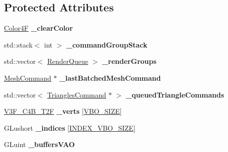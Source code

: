 \subsection*{Protected Attributes}
\begin{DoxyCompactItemize}
\item 
\mbox{\label{classRenderer_afe935eb7031cf3d5c68181e28f608972}} 
\hyperlink{structColor4F}{Color4F} {\bfseries \+\_\+clear\+Color}
\item 
\mbox{\label{classRenderer_a24f732b714ee4abcf3a256fbf78e697f}} 
std\+::stack$<$ int $>$ {\bfseries \+\_\+command\+Group\+Stack}
\item 
\mbox{\label{classRenderer_aeda6c2c7a5a5e8369c24e59eba37a03a}} 
std\+::vector$<$ \hyperlink{classRenderQueue}{Render\+Queue} $>$ {\bfseries \+\_\+render\+Groups}
\item 
\mbox{\label{classRenderer_ae9423c9b8ab799fb0f9173e09b10ea0a}} 
\hyperlink{classMeshCommand}{Mesh\+Command} $\ast$ {\bfseries \+\_\+last\+Batched\+Mesh\+Command}
\item 
\mbox{\label{classRenderer_af0e8a4e1834ce574e77b441c28df080d}} 
std\+::vector$<$ \hyperlink{classTrianglesCommand}{Triangles\+Command} $\ast$ $>$ {\bfseries \+\_\+queued\+Triangle\+Commands}
\item 
\mbox{\label{classRenderer_a4edfdd4a8eab5f3126ca0dc4ba817921}} 
\hyperlink{structV3F__C4B__T2F}{V3\+F\+\_\+\+C4\+B\+\_\+\+T2F} {\bfseries \+\_\+verts} \mbox{[}\hyperlink{classRenderer_adf68e0f4b14d92f2e8f357f44c52dd1d}{V\+B\+O\+\_\+\+S\+I\+ZE}\mbox{]}
\item 
\mbox{\label{classRenderer_aa3e0b017f3babd7cd3959f739b71e6bd}} 
G\+Lushort {\bfseries \+\_\+indices} \mbox{[}\hyperlink{classRenderer_a83bd66787b385c8a009d3cd64af54057}{I\+N\+D\+E\+X\+\_\+\+V\+B\+O\+\_\+\+S\+I\+ZE}\mbox{]}
\item 
\mbox{\label{classRenderer_aba5baf5389b40247a9c9fb88229f2832}} 
G\+Luint {\bfseries \+\_\+buffers\+V\+AO}
\item 
\mbox{\label{classRenderer_aa3afcf95eeddd42ece3faf7b6549c69b}} 

\end{DoxyCompactItemize}
